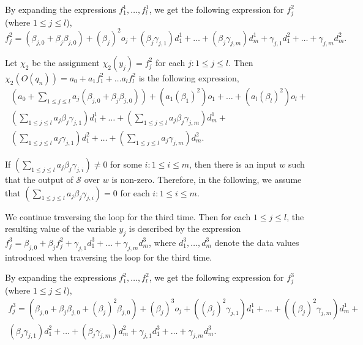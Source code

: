 \documentclass[runningheads,a4paper]{llncs}
\def\Ss{{\mathcal{S} }}
\begin{document}
By expanding the expressions $f^1_1,\dots, f^1_l$, we get the following expression for $f^2_{j}$ (where $1 \le j \le l$),
\[
f^2_{j} = (\beta_{j,0} + \beta_{j} \beta_{j,0}) + (\beta_{j})^2 o_{j} +
(\beta_{j}\gamma_{j,1}) d^1_1 +\dots + (\beta_{j}\gamma_{j,m}) d^1_m  + 
\gamma_{j,1} d^2_1 + \dots + \gamma_{j,m} d^2_m.
\]

Let $\chi_2$ be the assignment $\chi_2(y_j)=f^2_j$ for each $j: 1\le j \le l$.
Then $\chi_2(O(q_n)) = a_0+ a_1 f^2_1 + \dots a_l f^2_l$ is the following expression,
\[
\begin{array}{l}
(a_0 + \sum \limits_{1 \le j \le l} a_j (\beta_{j,0} + \beta_{j} \beta_{j,0})) +  (a_1 (\beta_1)^2) o_1 + \dots + (a_l (\beta_l)^2) o_l + \\
 (\sum \limits_{1 \le j \le l} a_j \beta_{j}\gamma_{j,1}) d^1_1 + \dots + (\sum \limits_{1 \le j \le l} a_j \beta_{j}\gamma_{j,m}) d^1_m + \\
(\sum \limits_{1 \le j \le l} a_j \gamma_{j,1}) d^2_1 + \dots + (\sum \limits_{1 \le j \le l} a_j \gamma_{j,m}) d^2_m.
\end{array}
\]

If $(\sum \limits_{1 \le j \le l} a_j \beta_j\gamma_{j,i}) \neq 0$ for some $i: 1 \le i \le m$, then there is an input $w$ such that the output of $\Ss$ over $w$ is non-zero. Therefore, in the following, we assume that $(\sum \limits_{1 \le j \le l} a_j \beta_j\gamma_{j,i}) = 0$ for each $i: 1 \le i \le m$.


We continue traversing the loop for the third time. Then for each $1 \le j \le l$,  the resulting value of the variable $y_{j}$ is described by the expression $f^3_{j} = \beta_{j,0} + \beta_{j} f^2_j  + \gamma_{j,1} d^3_1 + \dots + \gamma_{j,m} d^3_m$, where $d^3_1, \dots, d^3_m$ denote the data values introduced when traversing the loop for the third time. 

By expanding the expressions $f^2_1,\dots,f^2_l$, we get the following expression for $f^3_{j}$ (where $1\le j \le l$),
\[
\begin{array}{l}
f^3_{j} = (\beta_{j,0} + \beta_{j} \beta_{j,0} + (\beta_j)^2 \beta_{j,0}) + (\beta_{j})^3 o_{j} +
((\beta_{j})^2\gamma_{j,1}) d^1_1 +\dots + ((\beta_{j})^2\gamma_{j,m}) d^1_m  + \\
(\beta_j \gamma_{j,1}) d^2_1 + \dots + (\beta_j \gamma_{j,m}) d^2_m + \gamma_{j,1} d^3_1 + \dots + \gamma_{j,m} d^3_m.
\end{array}
\]
\end{document}

